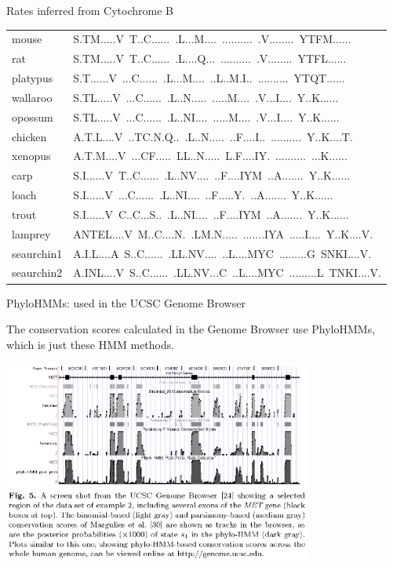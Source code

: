 \documentclass[bluish,slideColor,colorBG,pdf]{prosper}
\begin{document}
\begin{slide}[Replace]{Rates inferred from Cytochrome B}
{\begin{tabular}{l l}
mouse&S.TM.....V\ T..C......\ .L...M....\ ..........\ .V........\ YTFM......\\
rat&S.TM.....V\ T..C......\ .L....Q...\ ..........\ .V........\ YTFL......\\
platypus&S.T......V\ ...C......\ .L...M....\ ..L..M.I..\ ..........\ YTQT......\\
wallaroo&S.TL.....V\ ...C......\ .L..N.....\ .....M....\ .V...I....\ Y..K......\\
opossum&S.TL.....V\ ...C......\ .L..NI....\ .....M....\ .V...I....\ Y..K......\\
chicken&A.T.L....V\ ..TC.N.Q..\ .L..N.....\ ..F....I..\ ..........\ Y..K....T.\\
xenopus&A.T.M....V\ ...CF.....\ LL..N.....\ L.F....IY.\ ..........\ ...K......\\
carp&S.I......V\ T..C......\ .L..NV....\ ..F....IYM\ ..A.......\ Y..K......\\
loach&S.I......V\ ...C......\ .L..NI....\ ..F.....Y.\ ..A.......\ Y..K......\\
trout&S.I......V\ C..C...S..\ .L..NI....\ ..F....IYM\ ..A.......\ Y..K......\\
lamprey&ANTEL....V\ M..C....N.\ .LM.N.....\ .......IYA\ .....I....\ Y..K....V.\\
seaurchin1&A.I.L....A\ S..C......\ .LL.NV....\ ..L....MYC\ .........G\ SNKI....V.\\
seaurchin2&A.INL....V\ S..C......\ .LL.NV...C\ ..L....MYC\ .........L\ TNKI....V.\\
\end{tabular}
}

\end{slide}

\begin{slide}[Replace]{PhyloHMMs: used in the UCSC Genome Browser}

The conservation scores calculated in the Genome Browser use PhyloHMMs, which
is just these HMM methods.

\centerline{\includegraphics[width=4in]{phylohmm2.ps}}

\end{slide}
\end{document}
